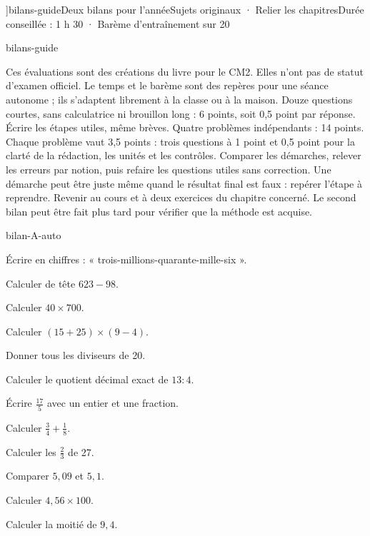 \editionPage[\pdfbookmark[0]{Deux bilans annuels}{bm-bilans-guide-parent}]{bilans-guide}{Deux bilans pour l’année}{Sujets originaux · Relier les chapitres}{Durée conseillée : 1 h 30 · Barème d’entraînement sur 20}
\begin{blocEdition}{bilans-guide}

Ces évaluations sont des créations du livre pour le CM2. Elles n’ont pas
de statut d’examen officiel. Le temps et le barème sont des repères pour
une séance autonome ; ils s’adaptent librement à la classe ou à la maison.
Douze questions courtes, sans calculatrice ni brouillon long : 6 points,
soit 0,5 point par réponse. Écrire les étapes utiles, même brèves.
Quatre problèmes indépendants : 14 points. Chaque problème vaut
3,5 points : trois questions à 1 point et 0,5 point pour la clarté de la
rédaction, les unités et les contrôles.
Comparer les démarches, relever les erreurs par notion, puis refaire
les questions utiles sans correction. Une démarche peut être juste
même quand le résultat final est faux : repérer l’étape à reprendre.
Revenir au cours et à deux exercices du chapitre concerné. Le second
bilan peut être fait plus tard pour vérifier que la méthode est acquise.

\end{blocEdition}
\begin{blocEdition}{bilan-A-auto}
\begin{questions}
\item Écrire en chiffres : « trois-millions-quarante-mille-six ».
\item Calculer de tête $623-98$.
\item Calculer $40\times700$.
\item Calculer $(15+25)\times(9-4)$.
\item Donner tous les diviseurs de 20.
\item Calculer le quotient décimal exact de $13:4$.
\item Écrire $\frac{17}5$ avec un entier et une fraction.
\item Calculer $\frac34+\frac18$.
\item Calculer les $\frac23$ de 27.
\item Comparer $5{,}09$ et $5{,}1$.
\item Calculer $4{,}56\times100$.
\item Calculer la moitié de $9{,}4$.\end{questions}
\end{blocEdition}
